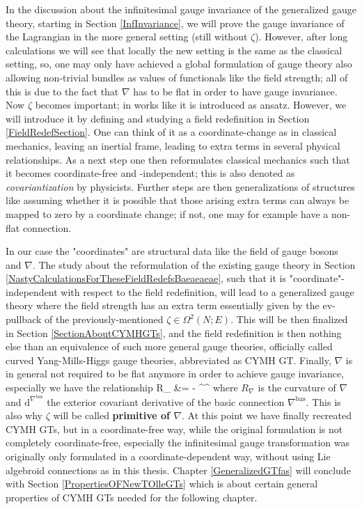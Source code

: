 In the discussion about the infinitesimal gauge invariance of the generalized gauge theory, starting in Section \ref{InfInvariance}, we will prove the gauge invariance of the Lagrangian in the more general setting (still without $\zeta$). However, after long calculations we will see that locally the new setting is the same as the classical setting, so, one may only have achieved a global formulation of gauge theory also allowing non-trivial bundles as values of functionals like the field strength; all of this is due to the fact that $\nabla$ has to be flat in order to have gauge invariance. Now $\zeta$ becomes important; in works like \cite{CurvedYMH} it is introduced as ansatz. However, we will introduce it by defining and studying a field redefinition in Section \ref{FieldRedefSection}. One can think of it as a coordinate-change as in classical mechanics, leaving an inertial frame, leading to extra terms in several physical relationships. As a next step one then reformulates classical mechanics such that it becomes coordinate-free and -independent; this is also denoted as \emph{covariantization} by physicists. Further steps are then generalizations of structures like assuming whether it is possible that those arising extra terms can always be mapped to zero by a coordinate change; if not, one may for example have a non-flat connection.

In our case the "coordinates" are structural data like the field of gauge bosons and $\nabla$. The study about the reformulation of the existing gauge theory in Section \ref{NastyCalculationsForTheseFieldRedefsBaeaeaeae}, such that it is "coordinate"-independent with respect to the field redefinition, will lead to a generalized gauge theory where the field strength has an extra term essentially given by the $\mathrm{ev}$-pullback of the previously-mentioned $\zeta \in \Omega^2(N;E)$. This will be then finalized in Section \ref{SectionAboutCYMHGTs}, and the field redefinition is then nothing else than an equivalence of such more general gauge theories, officially called curved Yang-Mills-Higgs gauge theories, abbreviated as CYMH GT. Finally, $\nabla$ is in general not required to be flat anymore in order to achieve gauge invariance, especially we have the relationship
\bas
R_\nabla
&=
- ^{\nabla^{}} \zeta
\eas
where $R_\nabla$ is the curvature of $\nabla$ and $\mathrm{d}^{\nabla^{\mathrm{bas}}}$ the exterior covariant derivative of the basic connection $\nabla^{\mathrm{bas}}$. This is also why $\zeta$ will be called \textbf{primitive of $\nabla$}. At this point we have finally recreated CYMH GTs, but in a coordinate-free way, while the original formulation is not completely coordinate-free, especially the infinitesimal gauge transformation was originally only formulated in a coordinate-dependent way, without using Lie algebroid connections as in this thesis. Chapter \ref{GeneralizedGTfas} will conclude with Section \ref{PropertiesOFNewTOlleGTs} which is about certain general properties of CYMH GTs needed for the following chapter.

